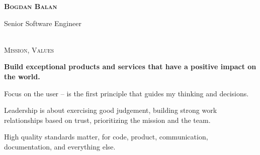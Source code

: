 \documentclass[10pt]{article}
\begin{document}
\noindent
\textcolor{Primary}{\textbf {\huge {\textsc{Bogdan Balan}}}}

\vspace{0.16in}
\noindent
Senior Software Engineer \\
\\

\vspace{0.32in}
\noindent
\textcolor{Primary}{{\large \textsc{Mission, Values}}}

\begin{list}{}{\leftmargin=0em}
  \setlength{\itemsep}{1pt}
  \setlength{\parskip}{0pt}
  \setlength{\parsep}{0pt}

\item
{\bf Build exceptional products and services that have a positive impact on the world.}
\item
Focus on the user -- is the first principle that guides my thinking and decisions.
\item
Leadership is about exercising good judgement, building strong work relationships based on trust, prioritizing the mission and the team.
\item
High quality standards matter, for code, product, communication, documentation, and everything else.

\end{list}
\end{document}
